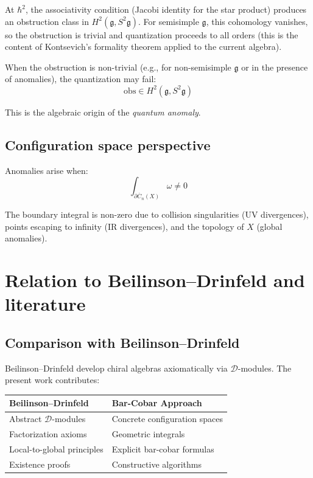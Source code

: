 At $\hbar^2$, the associativity condition (Jacobi identity for the star product) produces an obstruction class in $H^2(\mathfrak{g}, S^2\mathfrak{g})$.  For semisimple $\mathfrak{g}$, this cohomology vanishes, so the obstruction is trivial and quantization proceeds to all orders (this is the content of Kontsevich's formality theorem applied to the current algebra).

When the obstruction is non-trivial (e.g., for non-semisimple $\mathfrak{g}$ or in the presence of anomalies), the quantization may fail:
\[\text{obs} \in H^2(\mathfrak{g}, S^2\mathfrak{g})\]

This is the algebraic origin of the \emph{quantum anomaly}.

\subsection{Configuration space perspective}

Anomalies arise when:
\[\int_{\partial \overline{C}_n(X)} \omega \neq 0\]

The boundary integral is non-zero due to collision singularities (UV divergences), points escaping to infinity (IR divergences), and the topology of $X$ (global anomalies).

\section{Relation to Beilinson--Drinfeld and literature}

\subsection{Comparison with Beilinson--Drinfeld}

Beilinson--Drinfeld \cite{BD04} develop chiral algebras axiomatically via $\mathcal{D}$-modules. The present work contributes:

\begin{center}
\begin{tabular}{|l|l|}
\hline
\textbf{Beilinson--Drinfeld} & \textbf{Bar-Cobar Approach} \\
\hline
Abstract $\mathcal{D}$-modules & Concrete configuration spaces \\
Factorization axioms & Geometric integrals \\
Local-to-global principles & Explicit bar-cobar formulas \\
Existence proofs & Constructive algorithms \\
\hline
\end{tabular}
\end{center}


